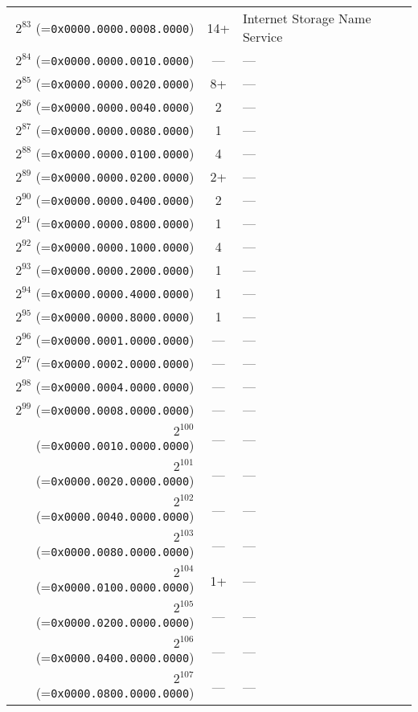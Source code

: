 \documentclass[documentation]{subfiles}
\begin{document}
\begin{small}
\begin{longtable}{rcl}
        $2^{83}$  (={\tt 0x0000.0000.0008.0000}) & 14+   & Internet Storage Name Service \\
        $2^{84}$  (={\tt 0x0000.0000.0010.0000}) & ---   & ---\\
        $2^{85}$  (={\tt 0x0000.0000.0020.0000}) & 8+    & ---\\
        $2^{86}$  (={\tt 0x0000.0000.0040.0000}) & 2     & ---\\
        $2^{87}$  (={\tt 0x0000.0000.0080.0000}) & 1     & ---\\
        $2^{88}$  (={\tt 0x0000.0000.0100.0000}) & 4     & ---\\
        $2^{89}$  (={\tt 0x0000.0000.0200.0000}) & 2+    & ---\\
        $2^{90}$  (={\tt 0x0000.0000.0400.0000}) & 2     & ---\\
        $2^{91}$  (={\tt 0x0000.0000.0800.0000}) & 1     & ---\\
        $2^{92}$  (={\tt 0x0000.0000.1000.0000}) & 4     & ---\\
        $2^{93}$  (={\tt 0x0000.0000.2000.0000}) & 1     & ---\\
        $2^{94}$  (={\tt 0x0000.0000.4000.0000}) & 1     & ---\\
        $2^{95}$  (={\tt 0x0000.0000.8000.0000}) & 1     & ---\\
        $2^{96}$  (={\tt 0x0000.0001.0000.0000}) & ---   & ---\\
        $2^{97}$  (={\tt 0x0000.0002.0000.0000}) & ---   & ---\\
        $2^{98}$  (={\tt 0x0000.0004.0000.0000}) & ---   & ---\\
        $2^{99}$  (={\tt 0x0000.0008.0000.0000}) & ---   & ---\\
        $2^{100}$ (={\tt 0x0000.0010.0000.0000}) & ---   & ---\\
        $2^{101}$ (={\tt 0x0000.0020.0000.0000}) & ---   & ---\\
        $2^{102}$ (={\tt 0x0000.0040.0000.0000}) & ---   & ---\\
        $2^{103}$ (={\tt 0x0000.0080.0000.0000}) & ---   & ---\\
        $2^{104}$ (={\tt 0x0000.0100.0000.0000}) & 1+    & ---\\
        $2^{105}$ (={\tt 0x0000.0200.0000.0000}) & ---   & ---\\
        $2^{106}$ (={\tt 0x0000.0400.0000.0000}) & ---   & ---\\
        $2^{107}$ (={\tt 0x0000.0800.0000.0000}) & ---   & ---\\

\end{longtable}
\end{small}
\end{document}
